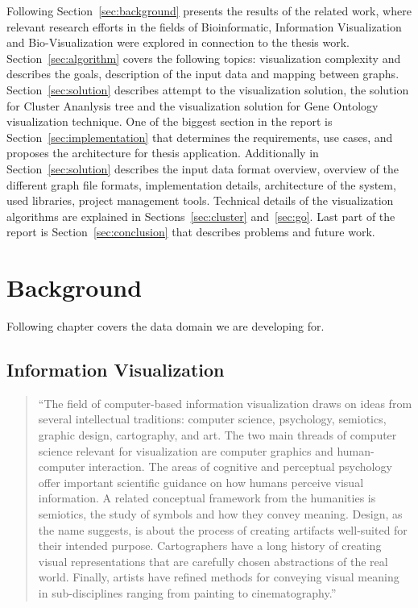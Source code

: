 Following Section~\ref{sec:background} presents the results of the related work, where relevant research efforts in the fields of Bioinformatic, Information Visualization and Bio-Visualization were explored in connection to the thesis work. Section~\ref{sec:algorithm} covers the following topics: visualization complexity and describes the goals, description of the input data and mapping between graphs. Section~\ref{sec:solution} describes attempt to the visualization solution, the solution for Cluster Ananlysis tree and the visualization solution for Gene Ontology visualization technique. One of the biggest section in the report is Section~\ref{sec:implementation} that determines the requirements, use cases, and proposes the architecture for thesis application.
Additionally in Section~\ref{sec:solution} describes the input data format overview, overview of the different graph file formats, implementation details, architecture of the system, used libraries, project management tools. Technical details of the visualization algorithms are explained in Sections~\ref{sec:cluster} and~\ref{sec:go}. Last part of the report is Section~\ref{sec:conclusion} that describes problems and future work.

\newpage
\section{Background}

Following chapter covers the data domain we are developing for.

\label{sec:background}


\subsection{Information Visualization}
\label{sec:infovis}

\begin{quotation}
``The field of computer-based information visualization draws on ideas from several intellectual traditions:
computer science, psychology, semiotics, graphic design, cartography, and art.
The two main threads of computer science relevant for visualization are computer graphics and human-computer interaction.
The areas of cognitive and perceptual psychology offer important scientific guidance on how humans perceive visual information.
A related conceptual framework from the humanities is semiotics, the study of symbols and how they convey meaning.
Design, as the name suggests, is about the process of creating artifacts well-suited for their intended purpose.
Cartographers have a long history of creating visual representations that are carefully chosen abstractions of the real world.
Finally, artists have refined methods for conveying visual meaning in sub-disciplines ranging from painting to cinematography.''~\cite{InfoVis}
\end{quotation}

